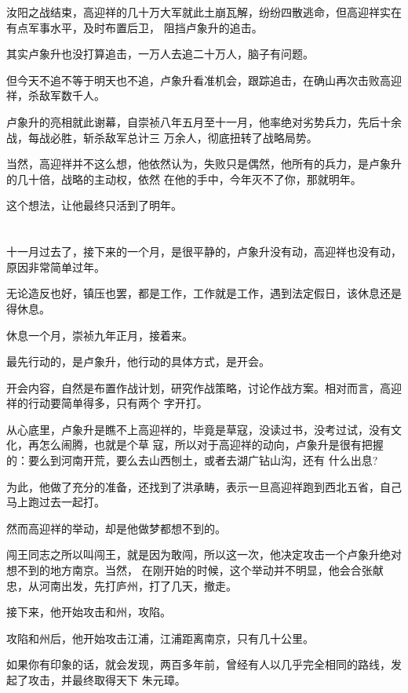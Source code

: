 \documentclass[11pt,a4paper,onecolumn]{article}
\begin{document}
汝阳之战结束，高迎祥的几十万大军就此土崩瓦解，纷纷四散逃命，但高迎祥实在有点军事水平，及时布置后卫，
阻挡卢象升的追击。

其实卢象升也没打算追击，一万人去追二十万人，脑子有问题。

但今天不追不等于明天也不追，卢象升看准机会，跟踪追击，在确山再次击败高迎祥，杀敌军数千人。

卢象升的亮相就此谢幕，自崇祯八年五月至十一月，他率绝对劣势兵力，先后十余战，每战必胜，斩杀敌军总计三
万余人，彻底扭转了战略局势。

当然，高迎祥并不这么想，他依然认为，失败只是偶然，他所有的兵力，是卢象升的几十倍，战略的主动权，依然
在他的手中，今年灭不了你，那就明年。

这个想法，让他最终只活到了明年。

\section[\thesection]{}

十一月过去了，接下来的一个月，是很平静的，卢象升没有动，高迎祥也没有动，原因非常简单\myrule 过年。

无论造反也好，镇压也罢，都是工作，工作就是工作，遇到法定假日，该休息还是得休息。

休息一个月，崇祯九年正月，接着来。

最先行动的，是卢象升，他行动的具体方式，是开会。

开会内容，自然是布置作战计划，研究作战策略，讨论作战方案。相对而言，高迎祥的行动要简单得多，只有两个
字\myrule 开打。

从心底里，卢象升是瞧不上高迎祥的，毕竟是草寇，没读过书，没考过试，没有文化，再怎么闹腾，也就是个草
寇，所以对于高迎祥的动向，卢象升是很有把握的：要么到河南开荒，要么去山西刨土，或者去湖广钻山沟，还有
什么出息?

为此，他做了充分的准备，还找到了洪承畴，表示一旦高迎祥跑到西北五省，自己马上跑过去一起打。

然而高迎祥的举动，却是他做梦都想不到的。

闯王同志之所以叫闯王，就是因为敢闯，所以这一次，他决定攻击一个卢象升绝对想不到的地方\myrule 南京。当然，
在刚开始的时候，这个举动并不明显，他会合张献忠，从河南出发，先打庐州，打了几天，撤走。

接下来，他开始攻击和州，攻陷。

攻陷和州后，他开始攻击江浦，江浦距离南京，只有几十公里。

如果你有印象的话，就会发现，两百多年前，曾经有人以几乎完全相同的路线，发起了攻击，并最终取得天下\myrule 
朱元璋。
\end{document}
